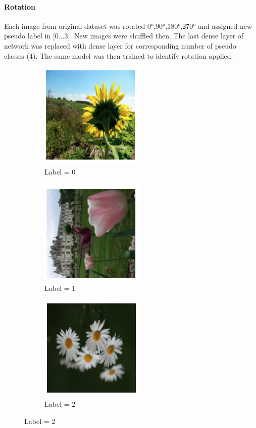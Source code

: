 \paragraph{Rotation}
Each image from original dataset was rotated 0°,90°,180°,270° and assigned new pseudo label in [0...3]. New images were shuffled then. The last dense layer of network was replaced with dense layer for corresponding number of pseudo classes (4). The same model was then trained to identify rotation applied.
\begin{figure}[!h]
    \begin{subfigure}{0.33\textwidth}
        \caption{Label = 0}
        \includegraphics[width=5cm]{images/rot_0.png}
    \end{subfigure}
    \begin{subfigure}{0.2\textwidth}
        \caption{Label = 1}
        \includegraphics[width=5cm]{images/rot_1.png}
    \end{subfigure}
    \begin{subfigure}{0.33\textwidth}
        \caption{Label = 2}
        \includegraphics[width=5cm]{images/rot_2.png}
    \end{subfigure}
\end{figure}

